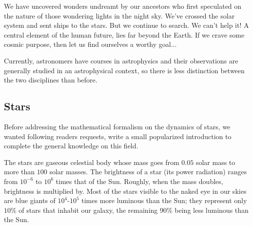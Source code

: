 	\begin{fquote}We have uncovered wonders undreamt by our ancestors who first speculated on the nature of those wondering lights in the night sky. We've crossed the solar system and sent ships to the stars. But we continue to search. We can't help it! A central element of the human future, lies far beyond the Earth. If we crave some cosmic purpose, then let us find ourselves a worthy goal...
 	\end{fquote}
	
	\begin{tcolorbox}[title=Remark,colframe=black,arc=10pt]
	Currently, astronomers have courses in astrophysics and their observations are generally studied in an astrophysical context, so there is less distinction between the two disciplines than before.
	\end{tcolorbox}
	
	\subsection{Stars}
	Before addressing the mathematical formalism on the dynamics of stars, we wanted following readers requests, write a small popularized introduction to complete the general knowledge on this field.
	
	The stars are gaseous celestial body whose mass goes from $0.05$ solar mass to more than $100$ solar masses. The brightness of a star (its power radiation) ranges from $10^{-6}$ to $10^6$ times that of the Sun. Roughly, when the mass doubles, brightness is multiplied by. Most of the stars visible to the naked eye in our skies are blue giants of $10^4$-$10^5$ times more luminous than the Sun; they represent only $10\%$ of stars that inhabit our galaxy, the remaining $90\%$ being less luminous than the Sun.
	
